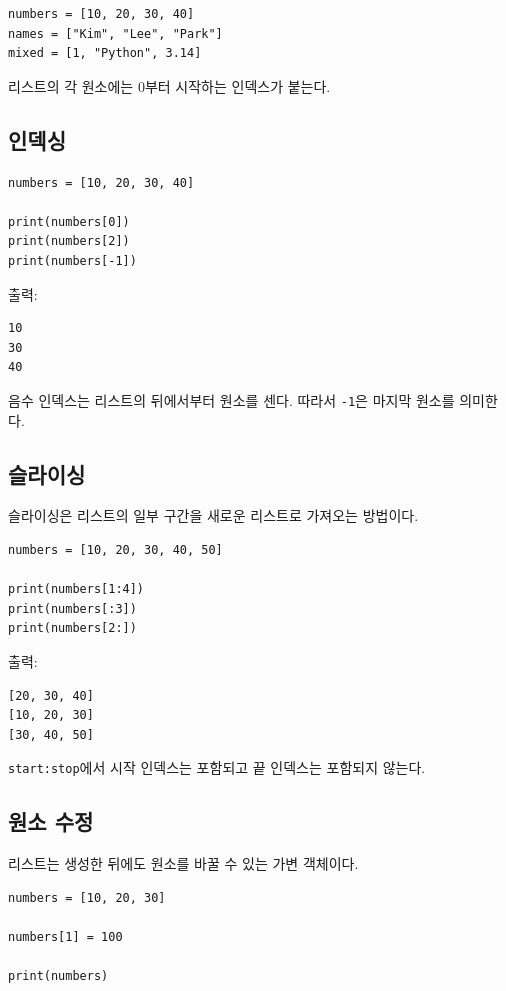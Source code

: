 \documentclass[11pt,a4paper]{article}
\begin{document}
\begin{lstlisting}
numbers = [10, 20, 30, 40]
names = ["Kim", "Lee", "Park"]
mixed = [1, "Python", 3.14]
\end{lstlisting}

리스트의 각 원소에는 0부터 시작하는 인덱스가 붙는다.

\subsection{인덱싱}

\begin{lstlisting}
numbers = [10, 20, 30, 40]

print(numbers[0])
print(numbers[2])
print(numbers[-1])
\end{lstlisting}

출력:

\begin{verbatim}
10
30
40
\end{verbatim}

음수 인덱스는 리스트의 뒤에서부터 원소를 센다. 따라서 \texttt{-1}은 마지막 원소를 의미한다.

\subsection{슬라이싱}

슬라이싱은 리스트의 일부 구간을 새로운 리스트로 가져오는 방법이다.

\begin{lstlisting}
numbers = [10, 20, 30, 40, 50]

print(numbers[1:4])
print(numbers[:3])
print(numbers[2:])
\end{lstlisting}

출력:

\begin{verbatim}
[20, 30, 40]
[10, 20, 30]
[30, 40, 50]
\end{verbatim}

\texttt{start:stop}에서 시작 인덱스는 포함되고 끝 인덱스는 포함되지 않는다.

\subsection{원소 수정}

리스트는 생성한 뒤에도 원소를 바꿀 수 있는 가변 객체이다.

\begin{lstlisting}
numbers = [10, 20, 30]

numbers[1] = 100

print(numbers)
\end{lstlisting}
\end{document}
